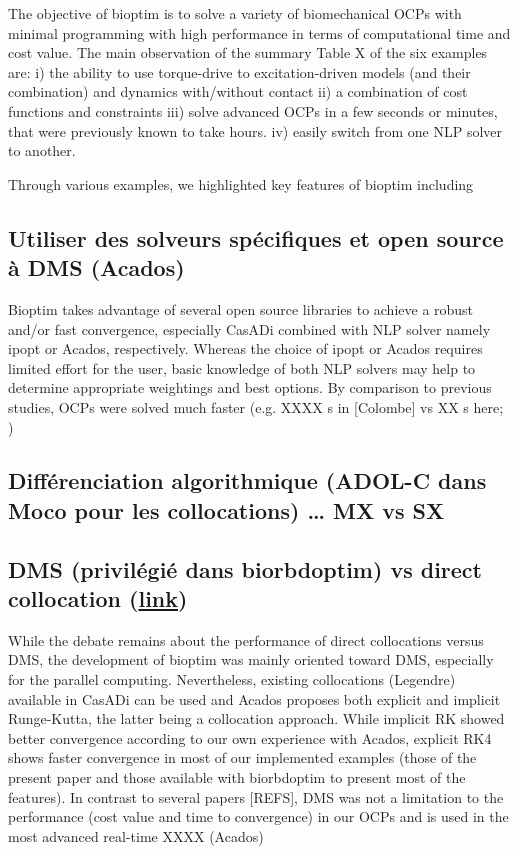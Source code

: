The objective of bioptim is to solve a variety of biomechanical OCPs with minimal programming with high performance in terms of computational time and cost value. The main observation of the summary Table X of the six examples are: 
i) the ability to use torque-drive to excitation-driven models (and their combination) and dynamics with/without contact 
ii) a combination of cost functions and constraints 
iii) solve advanced OCPs in a few seconds or minutes, that were previously known to take hours. 
iv) easily switch from one NLP solver to another.


Through various examples, we highlighted key features of bioptim including 


\subsection{Utiliser des solveurs spécifiques et open source à DMS (Acados)}

Bioptim takes advantage of several open source libraries to achieve a robust and/or fast convergence, especially CasADi combined with NLP solver namely ipopt or Acados, respectively. Whereas the choice of ipopt or Acados requires limited effort for the user, basic knowledge of both NLP solvers may help to determine appropriate weightings and best options. 
By comparison to previous studies, OCPs were solved much faster  (e.g. XXXX s in [Colombe] vs XX s here; )




\subsection{Différenciation algorithmique (ADOL-C dans Moco pour les collocations) … MX vs SX}



\subsection{DMS (privilégié dans biorbdoptim) vs direct collocation (\href{https://link.springer.com/chapter/10.1007/978-3-540-36119-0_4}{link})}


While the debate remains about the performance of direct collocations versus DMS, the development of bioptim was mainly oriented toward DMS, especially for the parallel computing. Nevertheless, existing collocations (Legendre) available in CasADi can be used and Acados proposes both explicit and implicit Runge-Kutta, the latter being a collocation approach. While implicit RK showed better convergence according to our own experience with Acados, explicit RK4 shows faster convergence in most of our implemented examples (those of the present paper and those available with biorbdoptim to present most of the features). In contrast to several papers [REFS], DMS was not a limitation to the performance (cost value and time to convergence) in our OCPs and is used in the most advanced real-time XXXX (Acados)

